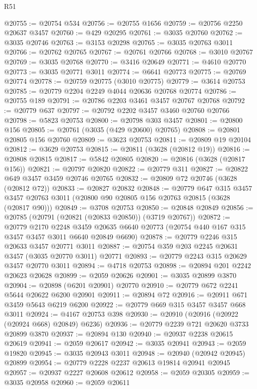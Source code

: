 \begin{lexlean}{R51}
\begin{coremodule}
@20755 := @20754 @534
@20756 := @20755 @1656
@20759 := @20756 @2250 @20637 @3457
@20760 := @429 @20295
@20761 := @3035 @20760
@20762 := @3035 @20746
@20763 := @3153 @20298
@20765 := @3035 @20763 @3011
@20766 := @20762 @20765
@20767 := @20761 @20766
@20768 := @3010 @20767
@20769 := @3035 @20768
@20770 := @3416 @20649
@20771 := @4610 @20770
@20773 := @3035 @20771 @3011
@20774 := @6641 @20773
@20775 := @20769 @20774
@20778 := @20759 @20775 (@3010 @20775)
@20779 := @3614 @20753
@20785 := @20779 @2204 @2249 @4044 @20636 @20768 @20774
@20786 := @20755 @189
@20791 := @20786 @2203 @3461 @3457 @20767 @20768
@20792 := @20779 @637
@20797 := @20792 @2202 @3457 @3460 @20760 @20766
@20798 := @5823 @20753
@20800 := @20798 @303 @3457
@20801 := @20800 @156
@20805 := @20761 (@3035 (@429 @20600) @20765)
@20808 := @20801 @20805 @156 @20760
@20809 := @3623 @20753
@20811 := @20809 @19 @20104
@20812 := @3629 @20753
@20815 := @20811 (@3628 (@20812 @19))
@20816 := @20808 @20815
@20817 := @5842 @20805
@20820 := @20816 (@3628 (@20817 @156))
@20821 := @20797 @20820
@20822 := @20779 @311
@20827 := @20822 @649 @3457 @3459 @20746 @20765
@20832 := @20809 @72 @20746 (@3628 (@20812 @72))
@20833 := @20827 @20832
@20848 := @20779
    @647
    @315
    @3457
    @3457
    @20763
    @3011
    (@20800 @90 @20805 @156 @20763 @20815 (@3628 (@20817 @90)))
@20849 := @3708 @20753
@20850 := @20848 @20849
@20856 := @20785 (@20791 (@20821 (@20833 @20850)) (@3719 @20767))
@20872 := @20779
    @2170
    @2248
    @3459
    @20635
    @6640
    @20773
    (@20754 @440 @167 @315 @3457 @3457 @3011 @6640 @20849 @6690)
@20878 := @20779 @2246 @315 @20633 @3457 @20771 @3011
@20887 := @20754 @359 @203 @2245 @20631 @3457 (@3035 @20770 @3011) @20771
@20893 := @20779 @2243 @315 @20629 @3457 @20770 @3011
@20894 := @4718 @20753
@20898 := @20894 @201 @2242 @20623 @20628
@20899 := @2059 @20626
@20901 := @3035 @20899 @3870
@20904 := @20898 (@6201 @20901) @20770
@20910 := @20779 @672 @2241 @5644 @20622 @6200 @20901
@20911 := @20894 @72
@20916 := @20911 @671 @3459 @5643 @6219 @6200
@20922 := @20779 @669 @315 @3457 @3457 @668 @3011
@20924 := @4167 @20753 @398
@20930 := @20910 (@20916 (@20922 (@20924 @668) @20849) @6236)
@20936 := @20779 @2239 @721 @20620 @3733 @20899 @3870
@20937 := @20894 @130
@20940 := @20937 @2238 @20615 @20619
@20941 := @2059 @20617
@20942 := @3035 @20941
@20943 := @2059 @19820
@20945 := @3035 @20943 @3011
@20948 := @20940 (@20942 @20945) @20899
@20954 := @20779 @2228 @2237 @20613 @19814 @20941 @20945
@20957 := @20937 @2227 @20608 @20612
@20958 := @2059 @20305
@20959 := @3035 @20958
@20960 := @2059 @20611

\end{coremodule}
\end{lexlean}

